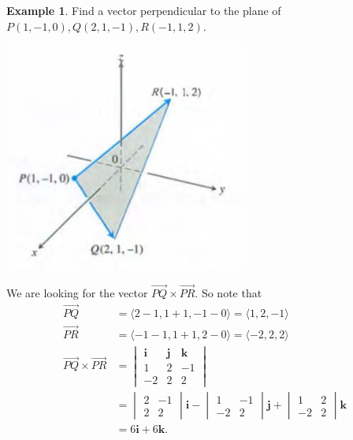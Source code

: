 \documentclass[12pt, letter]{article}
\theoremstyle{plain}
\numberwithin{theorem}{section}
\theoremstyle{definition}
\newtheorem{example}[theorem]{Example}
\begin{document}
\begin{example}
Find a vector perpendicular to the plane of $P(1,-1,0), Q(2,1,-1), R(-1,1,2)$.\\

\bigskip

\begin{center}
\includegraphics[scale=0.7]{m1_f13}
\end{center}

\bigskip

We are looking for the vector $\vec{PQ} \times \vec{PR}$. So note that
\begin{align*}
\vec{PQ} &= \langle 2-1, 1+1, -1-0 \rangle = \langle 1,2,-1 \rangle\\
\vec{PR} & = \langle -1-1, 1+1, 2-0 \rangle = \langle -2, 2, 2 \rangle\\
\vec{PQ} \times \vec{PR} &= \begin{vmatrix} \bm{i} & \bm{j} & \bm{k} \\ 1 & 2 & -1 \\ -2 & 2 & 2 \end{vmatrix}\\
&= \begin{vmatrix} 2 & -1 \\ 2 & 2 \end{vmatrix} \bm{i} - \begin{vmatrix} 1 & -1 \\ -2 & 2 \end{vmatrix} \bm{j} + \begin{vmatrix} 1 & 2 \\ -2 & 2 \end{vmatrix} \bm{k}\\
&= 6\bm{i} + 6\bm{k}.
\end{align*}
\end{example}
\end{document}
